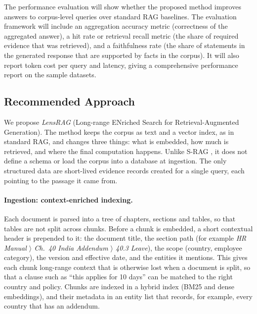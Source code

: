 \documentclass[11pt,letterpaper,oneside]{report}
\begin{document}
The performance evaluation will show whether the proposed method improves
answers to corpus-level queries over standard RAG baselines. The evaluation
framework will include an aggregation accuracy metric (correctness of the
aggregated answer), a hit rate or retrieval recall metric (the share of
required evidence that was retrieved), and a faithfulness rate (the share of
statements in the generated response that are supported by facts in the
corpus). It will also report token cost per query and latency, giving a
comprehensive performance report on the sample datasets.

\subsection{Recommended Approach}
\label{sec:approach}

We propose \emph{LensRAG} (Long-range ENriched Search for
Retrieval-Augmented Generation). The method keeps the corpus as text and a vector
index, as in standard RAG, and changes three things: what is embedded, how
much is retrieved, and where the final computation happens. Unlike S-RAG
\citep{koshorek2025srag}, it does not define a schema or load the corpus into
a database at ingestion. The only structured data are short-lived evidence
records created for a single query, each pointing to the passage it came
from.

\paragraph{Ingestion: context-enriched indexing.}
Each document is parsed into a tree of chapters, sections and tables, so that
tables are not split across chunks. Before a chunk is embedded, a short
contextual header is prepended to it: the document title, the section path
(for example \emph{HR Manual $\rangle$ Ch.~40 India Addendum $\rangle$ 40.3
Leave}), the scope (country, employee category), the version and effective
date, and the entities it mentions. This gives each chunk long-range context
that is otherwise lost when a document is split, so that a clause such as
``this applies for 10 days'' can be matched to the right country and policy.
Chunks are indexed in a hybrid index (BM25 and dense embeddings), and their
metadata in an entity list that records, for example, every country that has
an addendum.
\end{document}
